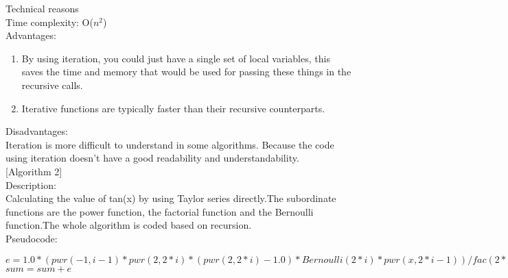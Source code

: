 \documentclass[12pt]{article}
\newcommand{\TITLE}[1]{\item[#1]}
\begin{document}
Technical reasons\\


Time complexity: O($n^{2}$)\\


Advantages:\\
\begin{enumerate}
\item By using iteration, you could just have a single set of local variables, this saves the time and memory that would be used for passing these things in the recursive calls.
\item Iterative functions are typically faster than their recursive counterparts.\\
\end{enumerate}


Disadvantages:\\

Iteration is more difficult to understand in some algorithms. Because the code using iteration doesn't have a good readability and understandability.\\


[Algorithm 2]\\


Description:\\


Calculating the value of tan(x) by using Taylor series  directly.The subordinate functions are the power function, the factorial function and the Bernoulli function.The whole algorithm is coded based on recursion. \\

Pseudocode:\\
\begin{algorithmic}[1]
  \TITLE{\textsc{tan}$(x)$}
  \STATE $e=1.0*(pwr(-1,i-1)*pwr(2,2*i)*(pwr(2,2*i)-1.0)*Bernoulli(2*i)*pwr(x,2*i-1))/fac(2*i)$
  \STATE $sum=sum+e$
  \ENDFOR
\end{algorithmic}

\begin{algorithmic}[1] 
  \TITLE{\textsc{pwr}$(x,n)$}
  \ELSE
  \ENDIF
\end{algorithmic}

\begin{algorithmic}[1] 
  \TITLE{\textsc{fac}$(n)$}
  \ELSE
  \ENDIF
\end{algorithmic}
\end{document}
